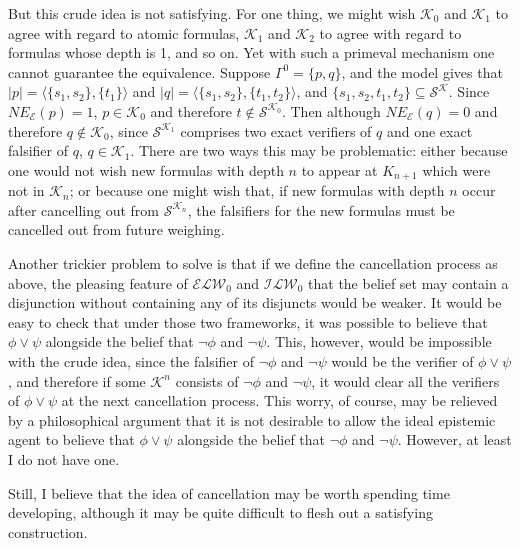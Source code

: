 \documentclass[12pt]{article}
\newcommand{\K}{\mathcal{K}}
\newcommand{\SK}{\mathcal{S}^\mathcal{K}}
\begin{document}
\par
But this crude idea is not satisfying. For one thing, we might wish $\K_0$ and $\K_1$ to agree with regard to atomic formulas, $\K_1$ and $\K_2$ to agree with regard to formulas whose depth is 1, and so on. Yet with such a primeval mechanism one cannot guarantee the equivalence. Suppose $\Gamma^0 = \{p, q\}$, and the model gives that $|p| = \langle \{s_1, s_2\}, \{t_1\} \rangle$ and $|q| = \langle \{s_1, s_2\}, \{t_1, t_2\} \rangle$, and $\{s_1, s_2, t_1, t_2\} \subseteq \SK$. Since $NE_\mathcal{E}(p) = 1$, $p \in \K_0$ and therefore $t \notin \mathcal{S}^{\mathcal{K}_0}$. Then although $NE_\mathcal{E}(q) = 0$ and therefore $q \notin \K_0$, since $\mathcal{S}^{\mathcal{K}_1}$ comprises two exact verifiers of $q$ and one exact falsifier of $q$, $q \in \K_1$. There are two ways this may be problematic: either because one would not wish new formulas with depth $n$ to appear at $K_{n+1}$ which were not in $\K_n$; or because one might wish that, if new formulas with depth $n$ occur after cancelling out from $\mathcal{S}^{\mathcal{K}_{n}}$, the falsifiers for the new formulas must be cancelled out from future weighing. 
\par
Another trickier problem to solve is that if we define the cancellation process as above, the pleasing feature of $\mathcal{ELW}_0$ and $\mathcal{ILW}_0$ that the belief set may contain a disjunction without containing any of its disjuncts would be weaker. It would be easy to check that under those two frameworks, it was possible to believe that $\phi \lor \psi$ alongside the belief that $\lnot \phi$ and $\lnot \psi$. This, however, would be impossible with the crude idea, since the falsifier of $\lnot \phi$ and $\lnot \psi$ would be the verifier of $\phi \lor \psi$, and therefore if some $\K^n$ consists of $\lnot \phi$ and $\lnot \psi$, it would clear all the verifiers of $\phi \lor \psi$ at the next cancellation process. This worry, of course, may be relieved by a philosophical argument that it is not desirable to allow the ideal epistemic agent to believe that $\phi \lor \psi$ alongside the belief that $\lnot \phi$ and $\lnot \psi$. However, at least I do not have one. 
\par
Still, I believe that the idea of cancellation may be worth spending time developing, although it may be quite difficult to flesh out a satisfying construction. 
\end{document}
